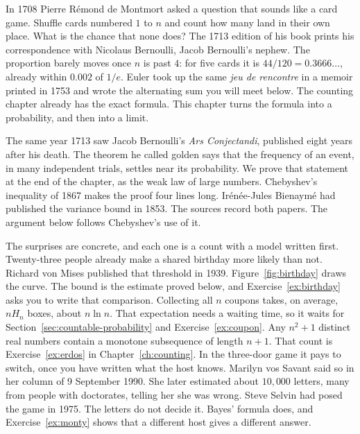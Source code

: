 In 1708 Pierre R\'emond de Montmort asked a question that sounds like a card game. Shuffle cards numbered $1$ to $n$ and count how many land in their own place. What is the chance that none does? The 1713 edition of his book prints his correspondence with Nicolaus Bernoulli, Jacob Bernoulli's nephew. The proportion barely moves once $n$ is past $4$: for five cards it is $44/120=0.3666\ldots$, already within $0.002$ of $1/e$. Euler took up the same \emph{jeu de rencontre} in a memoir printed in 1753 and wrote the alternating sum you will meet below. The counting chapter already has the exact formula. This chapter turns the formula into a probability, and then into a limit.

The same year 1713 saw Jacob Bernoulli's \emph{Ars Conjectandi}, published eight years after his death. The theorem he called golden says that the frequency of an event, in many independent trials, settles near its probability. We prove that statement at the end of the chapter, as the weak law of large numbers. Chebyshev's inequality of 1867 makes the proof four lines long. Ir\'en\'ee-Jules Bienaym\'e had published the variance bound in 1853. The sources record both papers. The argument below follows Chebyshev's use of it.


The surprises are concrete, and each one is a count with a model written first. Twenty-three people already make a shared birthday more likely than not. Richard von Mises published that threshold in 1939. Figure~\ref{fig:birthday} draws the curve. The bound is the estimate proved below, and Exercise~\ref{ex:birthday} asks you to write that comparison. Collecting all $n$ coupons takes, on average, $nH_n$ boxes, about $n\ln n$. That expectation needs a waiting time, so it waits for Section~\ref{sec:countable-probability} and Exercise~\ref{ex:coupon}. Any $n^2+1$ distinct real numbers contain a monotone subsequence of length $n+1$. That count is Exercise~\ref{ex:erdos} in Chapter~\ref{ch:counting}. In the three-door game it pays to switch, once you have written what the host knows. Marilyn vos Savant said so in her column of 9 September 1990. She later estimated about $10{,}000$ letters, many from people with doctorates, telling her she was wrong. Steve Selvin had posed the game in 1975. The letters do not decide it. Bayes' formula does, and Exercise~\ref{ex:monty} shows that a different host gives a different answer.

